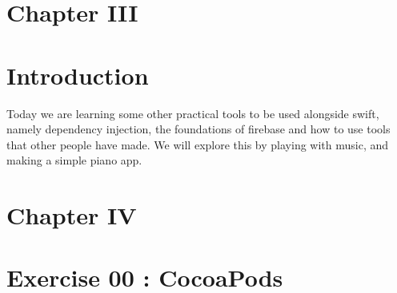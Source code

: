 \documentclass[12pt]{report}
\begin{document}
\vspace{\baselineskip}

\vspace{\baselineskip}



\newpage

\vspace{\baselineskip}
\vspace{\baselineskip}
\section*{Chapter III}
\section*{Introduction}
Today we are learning some other practical tools to be used alongside swift, namely dependency injection, the foundations of firebase and how to use tools that other people have made. We will explore this by playing with music, and making a simple piano app. \par


\vspace{\baselineskip}



\newpage

\vspace{\baselineskip}
\vspace{\baselineskip}
\section*{Chapter IV}
\section*{Exercise 00 : CocoaPods}

\vspace{\baselineskip}

\vspace{\baselineskip}

\vspace{\baselineskip}


\end{document}
